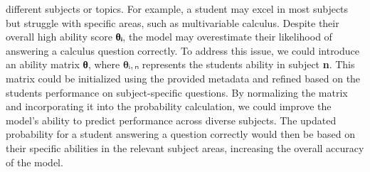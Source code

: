\begin{itemize}
  different subjects or topics. For example, a student may excel in most
  subjects but struggle with specific areas, such as multivariable
  calculus. Despite their overall high ability score \textbf{θᵢ}, the
  model may overestimate their likelihood of answering a calculus
  question correctly. To address this issue, we could introduce an
  ability matrix \textbf{θ}, where \(\mathbf{\theta ᵢ,ₙ}\) represents
  the student\textquotesingle s ability in subject \textbf{n}. This
  matrix could be initialized using the provided metadata and refined
  based on the student\textquotesingle s performance on subject-specific
  questions. By normalizing the matrix and incorporating it into the
  probability calculation, we could improve the model's ability to
  predict performance across diverse subjects. The updated probability
  for a student answering a question correctly would then be based on
  their specific abilities in the relevant subject areas, increasing the
  overall accuracy of the model.
\end{itemize}
